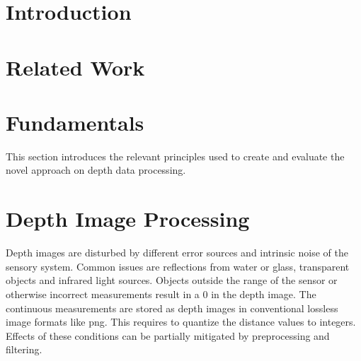 \documentclass[doktyp=marbeit,fontsize=12pt,sprache=english,hausschrift=true]{TUBAFarbeiten}
\begin{document}
\maketitle
\TUBAFErklaerungsseite%


\newpage

\newpage

\tableofcontents
\newpage



\newpage

\section{Introduction}

\newpage

\section{Related Work}

\newpage

\section{Fundamentals}

This section introduces the relevant principles used to create and evaluate the novel approach on depth data processing.






\newpage

\section{Depth Image Processing}

Depth images are disturbed by different error sources and intrinsic noise of the sensory system.
Common issues are reflections from water or glass, transparent objects and infrared light sources.
Objects outside the range of the sensor or otherwise incorrect measurements result in a $0$ in the depth image.
The continuous measurements are stored as depth images in conventional lossless image formats like png.
This requires to quantize the distance values to integers.
Effects of these conditions can be partially mitigated by preprocessing and filtering.




\newpage
\end{document}

